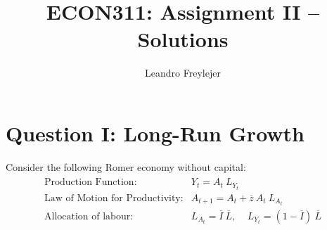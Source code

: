 \documentclass[letterpaper,12pt]{article}
\title{\vspace{-.4in} ECON311: Assignment II -- Solutions}
\author{Leandro Freylejer}
\date{}
\theoremstyle{dotlessS}
\begin{document}
\maketitle
\vspace{-.6in}

\section*{Question I: Long-Run Growth}
Consider the following Romer economy without capital: 
\begin{eqnarray*}
\begin{array}{ll}
\text{Production Function:} & Y_t=A_t \: L_{Y_t} \\[1.4ex]
\text{Law of Motion for Productivity:} & A_{t+1}=A_t+\overline{z} \: A_t \: L_{A_{t}}  \\[1.4ex]
\text{Allocation of labour:} & L_{A_{t}}=\overline{I} \: \overline{L}, \: \: \:  \: \: L_{Y_{t}}=(1-\overline{I}) \: \overline{L}  \\[1.4ex]
\end{array}
\end{eqnarray*}
\end{document}
